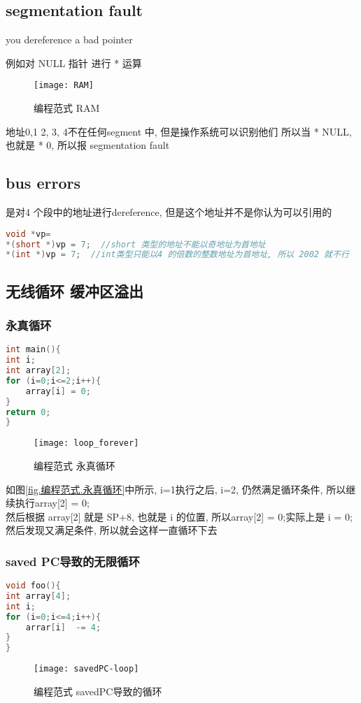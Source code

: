 \documentclass{article}
\begin{document}
\subsection{segmentation fault}
you dereference a bad pointer

例如对 NULL 指针 进行 * 运算
\begin{figure}[htbp]
	\centering
	\texttt{[image: RAM]}\\
	\caption{编程范式 RAM}\label{fig.RAM}
\end{figure}

地址0,1 2, 3, 4不在任何segment 中, 但是操作系统可以识别他们
所以当 * NULL, 也就是 * 0, 所以报 segmentation fault

\subsection{bus errors}
是对4 个段中的地址进行dereference, 但是这个地址并不是你认为可以引用的
\begin{lstlisting}[language = C]
void *vp=
*(short *)vp = 7;  //short 类型的地址不能以奇地址为首地址
*(int *)vp = 7;  //int类型只能以4 的倍数的整数地址为首地址, 所以 2002 就不行
\end{lstlisting}

\subsection{无线循环 缓冲区溢出}
\subsubsection{永真循环}
\begin{lstlisting}[language = C]
int main(){
int i;
int array[2];
for (i=0;i<=2;i++){
	array[i] = 0;
}
return 0;
}
\end{lstlisting}
\begin{figure}[htbp]
	\centering
	\texttt{[image: loop\_forever]}\\
	\caption{编程范式 永真循环}\label{fig.loop_forever}
\end{figure}

如图\ref{fig.编程范式.永真循环}中所示, i=1执行之后, i=2, 仍然满足循环条件, 所以继续执行array[2] = 0;\\
然后根据 array[2] 就是 SP+8, 也就是 i 的位置, 所以array[2] = 0;实际上是 i = 0; 然后发现又满足条件, 所以就会这样一直循环下去

\subsubsection{saved PC导致的无限循环}
\begin{lstlisting}[language = C]
void foo(){
int array[4];
int i;
for (i=0;i<=4;i++){
	arrar[i]  -= 4;
}
}
\end{lstlisting}
\begin{figure}[htbp]
	\centering
	\texttt{[image: savedPC-loop]}\\
	\caption{编程范式 savedPC导致的循环}\label{fig.savedPC-loop}
\end{figure}
\end{document}

